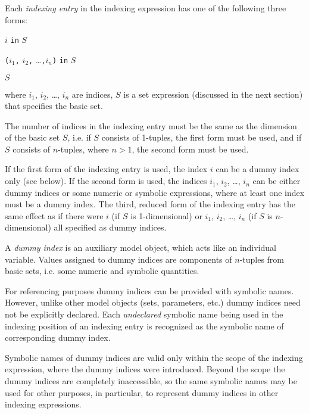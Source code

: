 \documentclass[10pt]{article}
\begin{document}
Each {\it indexing entry} in the indexing expression has one of the
following three forms:

\medskip

\noindent\hspace{123pt}
$i$ {\tt in} $S$

\medskip

\noindent\hfil
{\tt(}$i_1${\tt,} $i_2${\tt,} \dots{\tt,}$i_n${\tt)} {\tt in} $S$

\medskip

\noindent\hspace{123pt}
$S$

\medskip

\noindent where $i_1$, $i_2$, \dots, $i_n$ are indices, $S$ is a set
expression (discussed in the next section) that specifies the basic set.

The number of indices in the indexing entry must be the same as the
dimension of the basic set $S$, i.e. if $S$ consists of 1-tuples, the
first form must be used, and if $S$ consists of $n$-tuples, where
$n>1$, the second form must be used.

If the first form of the indexing entry is used, the index $i$ can be
a dummy index only (see below). If the second form is used, the indices
$i_1$, $i_2$, \dots, $i_n$ can be either dummy indices or some numeric
or symbolic expressions, where at least one index must be a dummy index.
The third, reduced form of the indexing entry has the same effect as if
there were $i$ (if $S$ is 1-dimensional) or $i_1$, $i_2$, \dots, $i_n$
(if $S$ is $n$-dimensional) all specified as dummy indices.

A {\it dummy index} is an auxiliary model object, which acts like an
individual variable. Values assigned to dummy indices are components of
$n$-tuples from basic sets, i.e. some numeric and symbolic quantities.

For referencing purposes dummy indices can be provided with symbolic
names. However, unlike other model objects (sets, parameters, etc.)
dummy indices need not be explicitly declared. Each {\it undeclared}
symbolic name being used in the indexing position of an indexing entry
is recognized as the symbolic name of corresponding dummy index.

Symbolic names of dummy indices are valid only within the scope of the
indexing expression, where the dummy indices were introduced. Beyond
the scope the dummy indices are completely inaccessible, so the same
symbolic names may be used for other purposes, in particular, to
represent dummy indices in other indexing expressions.
\end{document}
